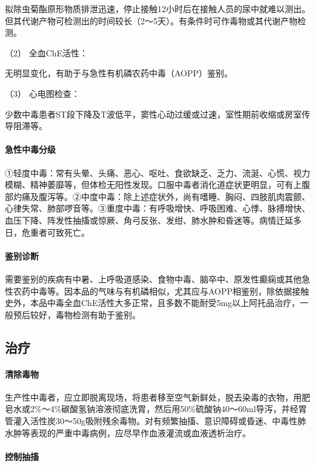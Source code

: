 拟除虫菊酯原形物质排泄迅速，停止接触12小时后在接触人员的尿中就难以测出。但其代谢产物可检测出的时间较长（2～5天）。有条件时可作毒物或其代谢产物检测。

\hypertarget{text00140.htmlux5cux23CHP5-3-2-2-3-2}{}
（2） 全血ChE活性：

无明显变化，有助于与急性有机磷农药中毒（AOPP）鉴别。

\hypertarget{text00140.htmlux5cux23CHP5-3-2-2-3-3}{}
（3） 心电图检查：

少数中毒患者ST段下降及T波低平，窦性心动过缓或过速，室性期前收缩或房室传导阻滞等。

\paragraph{急性中毒分级}

①轻度中毒：常有头晕、头痛、恶心、呕吐、食欲缺乏、乏力、流涎、心慌、视力模糊、精神萎靡等，但体检无阳性发现。口服中毒者消化道症状更明显，可有上腹部灼痛及腹泻等。②中度中毒：除上述症状外，尚有嗜睡、胸闷、四肢肌肉震颤、心律失常、肺部啰音等。③重度中毒：有呼吸增快、呼吸困难、心悸、脉搏增快、血压下降、阵发性抽搐或惊厥、角弓反张、发绀、肺水肿和昏迷等。病情迁延多日，危重者可致死亡。

\paragraph{鉴别诊断}

需要鉴别的疾病有中暑、上呼吸道感染、食物中毒、脑卒中、原发性癫痫或其他急性农药中毒等。因本品的气味与有机磷相似，尤其应与AOPP相鉴别，除依据接触史外，本品中毒全血ChE活性大多正常，且多数不能耐受5mg以上阿托品治疗，一般预后较好，毒物检测有助于鉴别。

\subsection{治疗}

\paragraph{清除毒物}

生产性中毒者，应立即脱离现场，将患者移至空气新鲜处，脱去染毒的衣物，用肥皂水或2\%～4\%碳酸氢钠溶液彻底洗胃，然后用50\%硫酸钠40～60ml导泻，并经胃管灌入活性炭30～50g吸附残余毒物。对有频繁抽搐、意识障碍或昏迷、中毒性肺水肿等表现的严重中毒病例，应尽早作血液灌流或血液透析治疗。

\paragraph{控制抽搐}

